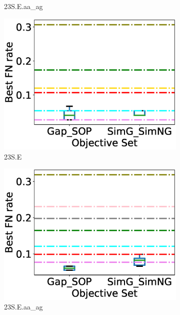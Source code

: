 \begin{figure}[!htbp]
\begin{adjustwidth}{-0.5cm}{-0.5cm}
\begin{subfigure}[b]{0.25\textwidth}
			\caption{23S.E.aa\_ag}
\end{subfigure}
		\begin{subfigure}[b]{0.25\textwidth}
			\includegraphics[width=\columnwidth]{Figure/summary/precomputedInit/23S.E/objset_fnrate_rank}
			\caption{23S.E}
\end{subfigure}    
		\begin{subfigure}[b]{0.25\textwidth}
			\includegraphics[width=\columnwidth]{Figure/summary/precomputedInit/23S.E.aa_ag/objset_fnrate_rank}
			\caption{23S.E.aa\_ag}
\end{subfigure}
\begin{subfigure}{0.25\textwidth}

\end{subfigure}
\end{adjustwidth}
\end{figure}
